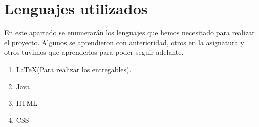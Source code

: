 \documentclass{scrartcl}
\begin{document}
\section{Lenguajes  utilizados}
En este apartado se enumerarán  los lenguajes que hemos necesitado para realizar el proyecto. Algunos se aprendieron con anterioridad, otros en la asignatura y otros tuvimos que aprenderlos para poder seguir adelante. 
\begin{enumerate}[\textbf{\textperiodcentered}]
	\item \LaTeX (Para realizar los entregables).
	\item Java
	\item HTML
	\item CSS
	
\end{enumerate}




	
\end{document}
